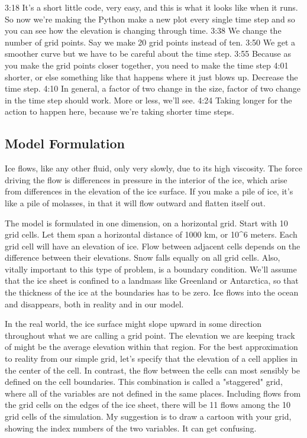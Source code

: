 {3:18
It's a short little code, very easy, and this is what it looks like when it runs. So now we're making the Python make a new plot every single time step and so you can see how the elevation is changing through time. 
3:38
We change the number of grid points. Say we make 20 grid points instead of ten. 
3:50
We get a smoother curve but we have to be careful about the time step. 
3:55
Because as you make the grid points closer together, you need to make the time step 
4:01
shorter, or else something like that happens where it just blows up. Decrease the time step. 
4:10
In general, a factor of two change in the size, factor of two change in the time step should work. More or less, we'll see. 
4:24
Taking longer for the action to happen here, because we're taking shorter time steps. 

\subsection{Model Formulation}\index{}
Ice flows, like any other fluid, only very slowly, due to its high viscosity. The force driving the flow is differences in pressure in the interior of the ice, which arise from differences in the elevation of the ice surface. If you make a pile of ice, it's like a pile of molasses, in that it will flow outward and flatten itself out.

The model is formulated in one dimension, on a horizontal grid. Start with 10 grid cells. Let them span a horizontal distance of 1000 km, or 10^6 meters. Each grid cell will have an elevation of ice. Flow between adjacent cells depends on the difference between their elevations. Snow falls equally on all grid cells. Also, vitally important to this type of problem, is a boundary condition. We'll assume that the ice sheet is confined to a landmass like Greenland or Antarctica, so that the thickness of the ice at the boundaries has to be zero. Ice flows into the ocean and disappears, both in reality and in our model.

In the real world, the ice surface might slope upward in some direction throughout what we are calling a grid point. The elevation we are keeping track of might be the average elevation within that region. For the best approximation to reality from our simple grid, let's specify that the elevation of a cell applies in the center of the cell. In contrast, the flow between the cells can most sensibly be defined on the cell boundaries. This combination is called a "staggered" grid, where all of the variables are not defined in the same places. Including flows from the grid cells on the edges of the ice sheet, there will be 11 flows among the 10 grid cells of the simulation. My suggestion is to draw a cartoon with your grid, showing the index numbers of the two variables. It can get confusing.

}
